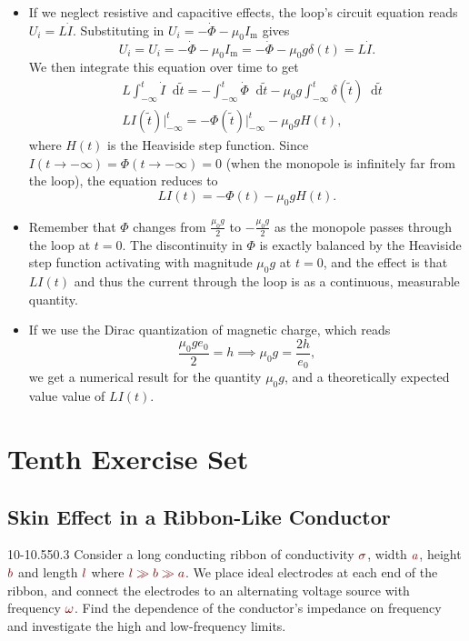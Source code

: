 \documentclass[11pt, a4paper]{article}
\newcommand{\diff}{\mathop{}\!\mathrm{d}} %
\newcommand{\dmath}[1]{\textcolor{Maroon}{#1}}  %
\renewcommand{\vec}[1]{\bm{#1}} %
\renewcommand{\t}[1]{\tilde{#1}} %
\newcommand{\mm}{\mu_{0}}  %
\newcommand{\m}{\vec{m}}  %
\newcommand{\defaultQuestionWidth}{0.55}
\begin{document}
\begin{itemize}
	\item If we neglect resistive and capacitive effects, the loop's circuit equation reads $ U_{i} = L \dot{I} $. Substituting in $  U_{i} = - \dot{\Phi} - \mm I_{\text{m}} $ gives
	\begin{equation*}
		U_{i} =  U_{i} = - \dot{\Phi} - \mm I_{\text{m}} = - \dot{\Phi} - \mm g \delta (t) = L \dot{I}.
	\end{equation*}
	We then integrate this equation over time to get
	\begin{align*}
		&L \int_{-\infty}^{t}\dot{I}\diff \t{t} = - \int_{-\infty}^{t} \dot{\Phi} \diff \t{t} - \mm g \int_{-\infty}^{t} \delta(\t{t})\diff \t{t}\\
		&LI(\t{t}) \Big |_{-\infty}^{t} = - \Phi(\t{t}) \Big|_{-\infty}^{t} - \mm g H(t),
	\end{align*}
	where $ H(t) $ is the Heaviside step function. Since $ I(t \to -\infty) = \Phi(t \to -\infty) = 0 $ (when the monopole is infinitely far from the loop), the equation reduces to
	\begin{equation*}
		LI(t) = - \Phi(t)  - \mm gH(t).
	\end{equation*}
	
	\item Remember that $ \Phi $ changes from $ \frac{\mm g}{2} $ to $ -\frac{\mm g}{2} $ as the monopole passes through the loop at $ t = 0 $. The discontinuity in $ \Phi $ is exactly balanced by the Heaviside step function activating with magnitude $ \mm g $ at $ t = 0 $, and the effect is that $ LI(t) $ and thus the current through the loop is as a continuous, measurable quantity. 
	
	\item If we use the Dirac quantization of magnetic charge, which reads
	\begin{equation*}
		\frac{\mm g e_{0}}{2} = h \implies \mm g = \frac{2h}{e_{0}},
	\end{equation*}
	we get a numerical result for the quantity $ \mm g $, and a theoretically expected value value of $ LI(t) $.
\end{itemize}


\newpage
\section{Tenth Exercise Set}

\subsection{Skin Effect in a Ribbon-Like Conductor}
\begin{figurequestion}{10-1}{\defaultQuestionWidth}{0.3}
Consider a long conducting ribbon of conductivity $ \dmath{\sigma} $, width $ \dmath{a} $, height $ \dmath{b} $ and length $ \dmath{l} $ where $ \dmath{l \gg b \gg a} $. We place ideal electrodes at each end of the ribbon, and connect the electrodes to an alternating voltage source with frequency $ \dmath{\omega} $. Find the dependence of the conductor's impedance on frequency and investigate the high and low-frequency limits.
\end{figurequestion}
\end{document}
